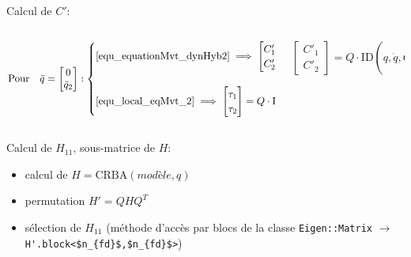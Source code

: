 \documentclass[10pt]{beamer}
\begin{document}
\begin{frame}
	Calcul de $C'$: 
	\begin{columns}[onlytextwidth]
	\begin{column}[c]{0.8\textwidth}\scriptsize
	\begin{align*}
	\left. \textnormal{Pour} \quad \ddot{q}=
	\begin{bmatrix}
	  0 \\
	  \ddot{q}_2
	\end{bmatrix}
	: 
	\begin{cases}
	\eqref{equ_equationMvt_dynHyb2}
	\implies
	\begin{bmatrix}
	  C'_1 \\
	  C'_2
	\end{bmatrix}
	=
	\begin{bmatrix}
	  \tau_1 \\
	  \tau_2
	\end{bmatrix} \\
	& \\
	\eqref{equ_local_eqMvt_2}
	\implies
	\begin{bmatrix}
	  \tau_1 \\
	  \tau_2
	\end{bmatrix}
	=
	Q \cdot \mathrm{ID} \left( q,\dot{q},Q^T
	\begin{bmatrix}
	  0 \\
	  \ddot{q}_2
	\end{bmatrix} \right)
	\end{cases} \right]
	\iff
	\end{align*}
	\end{column}
	\begin{column}[c]{0.27\textwidth}\tiny
	\begin{block}{}
	\begin{spacing}{1.5}
	$\begin{bmatrix}
	  C'_1 \\
	  C'_2
	\end{bmatrix}
	=
	Q \cdot \mathrm{ID} \left( q,\dot{q},Q^T
	\begin{bmatrix}
	  0 \\
	  \ddot{q}_2
	\end{bmatrix} \right)$
	\end{spacing}
	\end{block}
	\end{column}
	\end{columns}
  
  \bigskip
	Calcul de $H_{11}$, sous-matrice de $H$:
	\begin{itemize}
	\item calcul de $H = \mathrm{CRBA}(modèle,q)$
	\item permutation $H' = Q H Q^T$
	\item sélection de $H_{11}$ (méthode d'accès par blocs de la classe \verb;Eigen::Matrix; $\longrightarrow$ \verb;H'.block<$n_{fd}$,$n_{fd}$>;)
	\end{itemize}

\end{frame}
\end{document}
